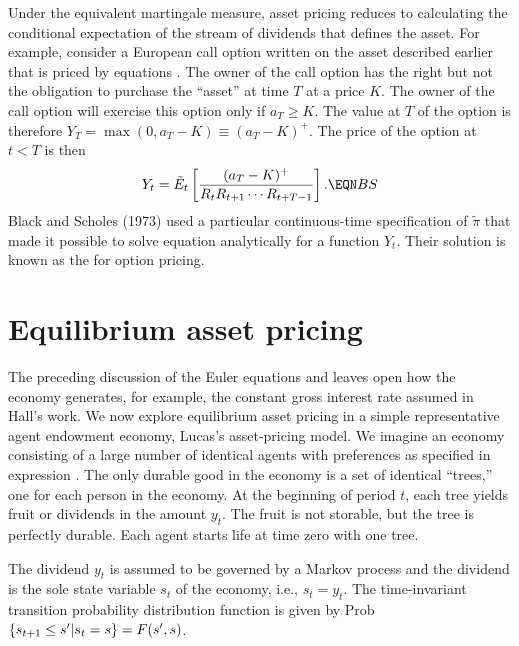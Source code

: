    Under the equivalent martingale measure, asset pricing
reduces to calculating the conditional expectation of
the stream of dividends that defines the asset.
For example, consider a European  %
 call option written on the asset described earlier
that is priced by equations .    The owner of the call
option has the right but not the obligation
to purchase the ``asset'' at time $T$ at a price
$K$.  The owner  of the call option will exercise this option
only if $a_T \geq K$.  The value at $T$ of the option is
therefore $ Y_T = \max(0, a_T - K) \equiv (a_T-K)^+$.  The price
of the option at $t <T$ is then
$$ Y_t = \tilde E_t \left[{(a_T-K)^+\over R_t R_{t+1} \cdots R_{t+T-1}}\right]
.  \EQN BS  $$
Black and Scholes (1973) used a particular continuous-time
 specification of $\tilde \pi$ that made it possible to
solve equation  analytically for a function
$Y_t$.  Their solution is known as
the  for option pricing.
 

\section{Equilibrium asset pricing}\label{eq_asset_pricing}%
The preceding discussion of the Euler equations
 and  leaves open
how the economy generates, for example, the constant gross interest rate
assumed in Hall's work.  We now explore equilibrium asset pricing
in a  simple representative agent endowment economy,
Lucas's asset-pricing model.  We imagine an economy consisting of a large
number of identical agents with preferences as specified in expression
 .
The only durable good in the economy is a set of identical ``trees,''
one for each person  in the economy.
At the beginning of period $t$, each tree yields fruit or dividends in the
amount $y_t$.
The fruit is not storable, but the tree is perfectly durable.
Each agent starts life at time zero with one tree.


The dividend $y_t$ is assumed to be governed by a Markov process
and the dividend is the sole state variable $s_t$ of the economy, i.e.,
$s_t=y_t$. The time-invariant transition probability
distribution function is given by Prob$\{s_{{t+1}}\le s'|s_t=s\}=F(s',s)$.



